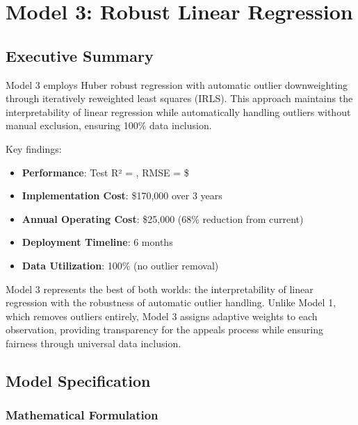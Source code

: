 
\chapter{Model 3: Robust Linear Regression}\label{ch:model3}



\section{Executive Summary}

Model 3 employs Huber robust regression with automatic outlier downweighting through iteratively reweighted least squares (IRLS). This approach maintains the interpretability of linear regression while automatically handling outliers without manual exclusion, ensuring 100\% data inclusion.

Key findings:
\begin{itemize}
    \item \textbf{Performance}: Test R² = \ModelThreeRSquaredTest{}, RMSE = \$\ModelThreeRMSETest{}
    \item \textbf{Implementation Cost}: \$170,000 over 3 years
    \item \textbf{Annual Operating Cost}: \$25,000 (68\% reduction from current)
    \item \textbf{Deployment Timeline}: 6 months
    \item \textbf{Data Utilization}: 100\% (no outlier removal)
\end{itemize}

Model 3 represents the best of both worlds: the interpretability of linear regression with the robustness of automatic outlier handling. Unlike Model 1, which removes outliers entirely, Model 3 assigns adaptive weights to each observation, providing transparency for the appeals process while ensuring fairness through universal data inclusion.

\section{Model Specification}

\subsection{Mathematical Formulation}

